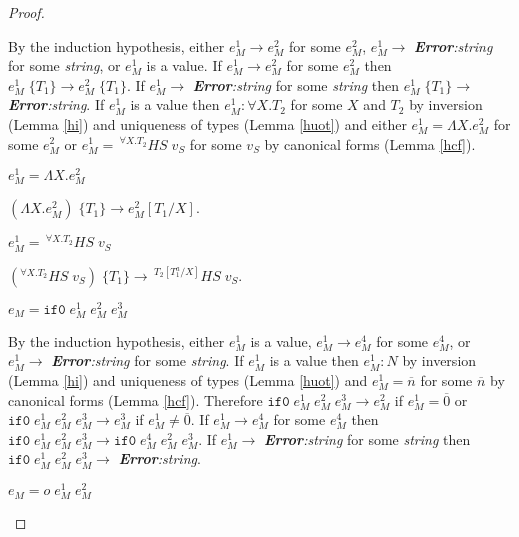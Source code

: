 \begin{mps}
\begin{proof}
\begin{mps-case-8}
By the induction hypothesis, either $e_{M}^{1}\rightarrow e_{M}^{2}$ for some $e_{M}^{2}$, $e_{M}^{1}\rightarrow$ \emph{\textbf{Error}:\;string} for some \emph{string}, or $e_{M}^{1}$ is a value.  If $e_{M}^{1}\rightarrow e_{M}^{2}$ for some $e_{M}^{2}$ then $e_{M}^{1}\;\lbrace T_{1}\rbrace\rightarrow e_{M}^{2}\;\lbrace T_{1}\rbrace$.  If $e_{M}^{1}\rightarrow$ \emph{\textbf{Error}:\;string} for some \emph{string} then $e_{M}^{1}\;\lbrace T_{1}\rbrace\rightarrow$ \emph{\textbf{Error}:\;string}.  If $e_{M}^{1}$ is a value then $e_{M}^{1}:\forall X.T_{2}$ for some $X$ and $T_{2}$ by inversion (Lemma \ref{hi}) and uniqueness of types (Lemma \ref{huot}) and either $e_{M}^{1}=\Lambda X.e_{M}^{2}$ for some $e_{M}^{2}$ or $e_{M}^{1}=\,^{\forall X.T_{2}}HS\;v_{S}$ for some $v_{S}$ by canonical forms (Lemma \ref{hcf}).
\end{mps-case-8}
\begin{mps-case-8-1}
$e_{M}^{1}=\Lambda X.e_{M}^{2}$

$(\Lambda X.e_{M}^{2})\;\lbrace T_{1}\rbrace\rightarrow e_{M}^{2}[T_{1}/X]$.
\end{mps-case-8-1}
\begin{mps-case-8-2}
$e_{M}^{1}=\,^{\forall X.T_{2}}HS\;v_{S}$

$(^{\forall X.T_{2}}HS\;v_{S})\;\lbrace T_{1}\rbrace\rightarrow\,^{T_{2}[T_{1}^{a}/X]}HS\;v_{S}$.
\end{mps-case-8-2}
\begin{mps-case-9}
$e_{M}=\mathtt{if0}\;e_{M}^{1}\;e_{M}^{2}\;e_{M}^{3}$

By the induction hypothesis, either $e_{M}^{1}$ is a value, $e_{M}^{1}\rightarrow e_{M}^{4}$ for some $e_{M}^{4}$, or $e_{M}^{1}\rightarrow$ \emph{\textbf{Error}:\;string} for some \emph{string}.  If $e_{M}^{1}$ is a value then $e_{M}^{1}:N$ by inversion (Lemma \ref{hi}) and uniqueness of types (Lemma \ref{huot}) and $e_{M}^{1}=\overline{n}$ for some $\overline{n}$ by canonical forms (Lemma \ref{hcf}).  Therefore $\mathtt{if0}\;e_{M}^{1}\;e_{M}^{2}\;e_{M}^{3}\rightarrow e_{M}^{2}$ if $e_{M}^{1}=\overline{0}$ or $\mathtt{if0}\;e_{M}^{1}\;e_{M}^{2}\;e_{M}^{3}\rightarrow e_{M}^{3}$ if $e_{M}^{1}\neq\overline{0}$.  If $e_{M}^{1}\rightarrow e_{M}^{4}$ for some $e_{M}^{4}$ then $\mathtt{if0}\;e_{M}^{1}\;e_{M}^{2}\;e_{M}^{3}\rightarrow \mathtt{if0}\;e_{M}^{4}\;e_{M}^{2}\;e_{M}^{3}$.  If $e_{M}^{1}\rightarrow$ \emph{\textbf{Error}:\;string} for some \emph{string} then $\mathtt{if0}\;e_{M}^{1}\;e_{M}^{2}\;e_{M}^{3}\rightarrow$ \emph{\textbf{Error}:\;string}.
\end{mps-case-9}
\begin{mps-case-10}
$e_{M}=o\;e_{M}^{1}\;e_{M}^{2}$


\end{mps-case-10}
\end{proof}
\end{mps}

